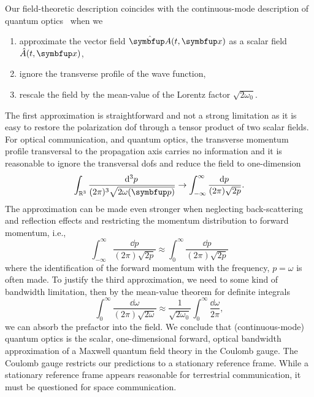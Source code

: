 Our field-theoretic description coincides with the continuous-mode description of quantum optics~\cite{Barnett2002,Loudon2000,Vogel2006,Shapiro2009} when we
\begin{enumerate}
	\item approximate the vector field $\vu{A}(t,\vb{x})$ as a scalar field $\hat{A}(t,\vb{x})$,
	\item ignore the transverse profile of the wave function,
	\item rescale the field by the mean-value of the Lorentz factor $\sqrt{2\omega_0}$.
\end{enumerate}
The first approximation is straightforward and not a strong limitation as it is easy to restore the polarization \gls{dof} through a tensor product of two scalar fields.
For optical communication, and quantum optics, the transverse momentum profile transversal to the propagation axis carries no information and it is reasonable to ignore the transversal \gls{dof}s and reduce the field to one-dimension~\cite[p.~53]{Cohen2019}
\begin{equation}
	\int_{\mathbb{R}^3}
	\frac{\dd[3]{p}}{(2\pi)^3\sqrt{2\omega(\vb{p})}}
	\to
	\int_{-\infty}^{\infty}
	\frac{\dd{p}}{(2\pi)\sqrt{2p}}
	.
\end{equation}
The approximation can be made even stronger when neglecting back-scattering and reflection effects and restricting the momentum distribution to forward momentum, i.e.,
\begin{equation}
	\int_{-\infty}^{\infty}
	\frac{\dd{p}}{(2\pi)\sqrt{2p}}
	\approx	
	\int_{0}^{\infty}
	\frac{\dd{p}}{(2\pi)\sqrt{2p}}	
\end{equation}
where the identification of the forward momentum with the frequency, $p=\omega$ is often made.
To justify the third approximation, we need to some kind of bandwidth limitation, then by the mean-value theorem for definite integrals
\begin{equation}
	\int_{0}^{\infty}
	\frac{\dd{\omega}}{(2\pi)\sqrt{2\omega}}
	\approx
	\frac{1}{\sqrt{2\omega_0}}
	\int_{0}^{\infty}
	\frac{\dd{\omega}}{2\pi}
	,
\end{equation}
we can absorb the prefactor into the field.
We conclude that (continuous-mode) quantum optics is the scalar, one-dimensional forward, optical bandwidth approximation of a Maxwell quantum field theory in the Coulomb gauge.
The Coulomb gauge restricts our predictions to a stationary reference frame.
While a stationary reference frame appears reasonable for terrestrial communication, it must be questioned for space communication.

